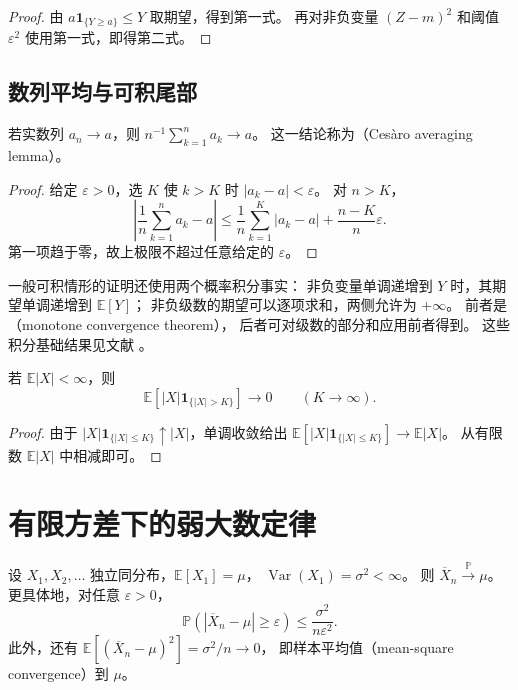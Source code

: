\documentclass[UTF8]{ctexart}
\begin{document}
\begin{proof}
由 $a\mathbf1_{\{Y\geq a\}}\leq Y$ 取期望，得到第一式。
再对非负变量 $(Z-m)^2$ 和阈值 $\varepsilon^2$ 使用第一式，即得第二式。
\end{proof}

\subsection{数列平均与可积尾部}

\begin{lemma}[收敛数列的平均仍收敛]
\label{lem:lln-cesaro}
若实数列 $a_n\to a$，则 $n^{-1}\sum_{k=1}^n a_k\to a$。
这一结论称为（Cesàro averaging lemma）。
\end{lemma}

\begin{proof}
给定 $\varepsilon>0$，选 $K$ 使 $k>K$ 时 $|a_k-a|<\varepsilon$。
对 $n>K$，
\[
  \left|\frac1n\sum_{k=1}^na_k-a\right|
  \leq\frac1n\sum_{k=1}^K|a_k-a|+\frac{n-K}{n}\varepsilon.
\]
第一项趋于零，故上极限不超过任意给定的 $\varepsilon$。
\end{proof}

一般可积情形的证明还使用两个概率积分事实：
非负变量单调递增到 $Y$ 时，其期望单调递增到 $\mathbb E[Y]$；
非负级数的期望可以逐项求和，两侧允许为 $+\infty$。
前者是（monotone convergence theorem），
后者可对级数的部分和应用前者得到。
这些积分基础结果见文献 \cite[第 1.6--1.7 节]{durrett-lln}。

\begin{lemma}[可积变量的尾部贡献趋于零]
\label{lem:lln-tail}
若 $\mathbb E|X|<\infty$，则
\[
  \mathbb E[|X|\mathbf1_{\{|X|>K\}}]\longrightarrow0
  \qquad(K\to\infty).
\]
\end{lemma}

\begin{proof}
由于 $|X|\mathbf1_{\{|X|\leq K\}}\uparrow|X|$，单调收敛给出
$\mathbb E[|X|\mathbf1_{\{|X|\leq K\}}]\to\mathbb E|X|$。
从有限数 $\mathbb E|X|$ 中相减即可。
\end{proof}

\section{有限方差下的弱大数定律}
\label{sec:lln-weak-finite}

\begin{theorem}[有限方差的弱大数定律]
\label{thm:lln-wlln-finite}
设 $X_1,X_2,\ldots$ 独立同分布，$\mathbb E[X_1]=\mu$，
$\operatorname{Var}(X_1)=\sigma^2<\infty$。
则 $\overline X_n\xrightarrow{\mathbb P}\mu$。更具体地，对任意 $\varepsilon>0$，
\begin{equation}
  \mathbb P(|\overline X_n-\mu|\geq\varepsilon)
  \leq\frac{\sigma^2}{n\varepsilon^2}.
  \label{eq:lln-wlln-bound}
\end{equation}
此外，还有 $\mathbb E[(\overline X_n-\mu)^2]=\sigma^2/n\to0$，
即样本平均值（mean-square convergence）到 $\mu$。
\end{theorem}
\end{document}
